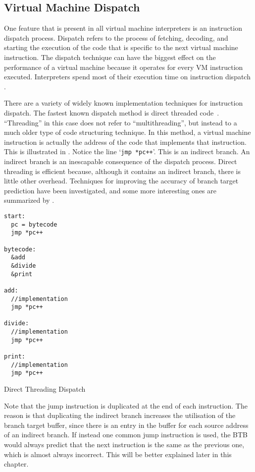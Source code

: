 		\subsection{Virtual Machine Dispatch}
		One feature that is present in all virtual machine interpreters is an instruction dispatch process. Dispatch refers to the process of fetching, decoding, and starting the execution of the code that is specific to the next virtual machine instruction. The dispatch technique can have the biggest effect on the performance of a virtual machine because it operates for every VM instruction executed. Interpreters spend most of their execution time on instruction dispatch \citep{modernarchvm}. 
		
		There are a variety of widely known implementation techniques for instruction dispatch. The fastest known dispatch method is direct threaded code~\citep{structureinterpreters}. ``Threading'' in this case does not refer to ``multithreading'', but instead to a much older type of code structuring technique. In this method, a virtual machine instruction is actually the address of the code that implements that instruction. This is illustrated in . Notice the line `\texttt{jmp *pc++}'. This is an indirect branch. An indirect branch is an inescapable consequence of the dispatch process. Direct threading is efficient because, although it contains an indirect branch, there is little other overhead. Techniques for improving the accuracy of branch target prediction have been investigated, and some more interesting ones are summarized by \cite{optimizingindirectbranch}. 
		
		\begin{myfigure}
				\begin{lstlisting}
start:
  pc = bytecode
  jmp *pc++

bytecode:
  &add
  &divide
  &print

add:
  //implementation
  jmp *pc++

divide:
  //implementation
  jmp *pc++

print:
  //implementation
  jmp *pc++

				\end{lstlisting}
				\caption{Direct Threading Dispatch}
				\label{fig:directthreading}
		\end{myfigure}
		
		Note that the jump instruction is duplicated at the end of each instruction. The reason is that duplicating the indirect branch increases the utilisation of the branch target buffer, since there is an entry in the buffer for each source address of an indirect branch. If instead one common jump instruction is used, the BTB would always predict that the next instruction is the same as the previous one, which is almost always incorrect. This will be better explained later in this chapter.
		
